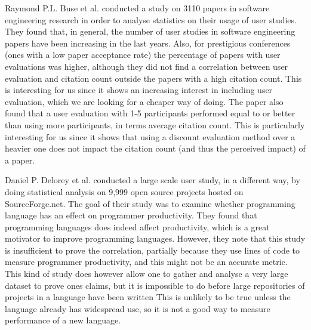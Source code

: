 Raymond P.L. Buse et al. \cite{UserEvalPapers} conducted a study on 3110 papers in software engineering research in order to analyse statistics on their usage of user studies.
They found that, in general, the number of user studies in software engineering papers have been increasing in the last years.
Also, for prestigious conferences (ones with a low paper acceptance rate) the percentage of papers with user evaluations was higher, although they did not find a correlation between user evaluation and citation count outside the papers with a high citation count.
This is interesting for us since it shows an increasing interest in including user evaluation, which we are looking for a cheaper way of doing.
The paper also found that a user evaluation with 1-5 participants performed equal to or better than using more participants, in terms average citation count.
This is particularly interesting for us since it shows that using a discount evaluation method over a heavier one does not impact the citation count (and thus the perceived impact) of a paper.

Daniel P. Delorey et al. \cite{LanguageProductivity} conducted a large scale user study, in a different way, by doing statistical analysis on 9,999 open source projects hosted on SourceForge.net.
The goal of their study was to examine whether programming language has an effect on programmer productivity.
They found that programming languages does indeed affect productivity, which is a great motivator to improve programming languages.
However, they note that this study is insufficient to prove the correlation, partially because they use lines of code to measure programmer productivity, and this might not be an accurate metric.
This kind of study does however allow one to gather and analyse a very large dataset to prove ones claims, but it is impossible to do before large repositories of projects in a language have been written
This is unlikely to be true unless the language already has widespread use, so it is not a good way to measure performance of a new language.